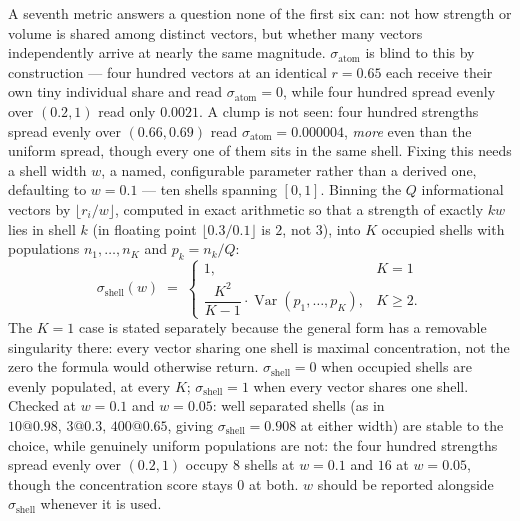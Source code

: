 \documentclass[12pt, a4paper]{article}
\begin{document}
A seventh metric answers a question none of the first six can: not
how strength or volume is shared among distinct vectors, but whether
many vectors independently arrive at nearly the same magnitude.
$\sigma_{\text{atom}}$ is blind to this by construction --- four hundred vectors at an identical $r=0.65$ each receive their own tiny individual share and read $\sigma_{\text{atom}}=0$, while four hundred spread evenly over $(0.2,1)$ read only $0.0021$. A clump is not seen: four hundred strengths spread evenly over $(0.66,0.69)$ read $\sigma_{\text{atom}}=0.000004$, \emph{more} even than the uniform spread, though every one of them sits in the same shell. Fixing this needs a shell width $w$, a named,
configurable parameter rather than a derived one, defaulting to
$w=0.1$ --- ten shells spanning $[0,1]$. Binning the $Q$ informational vectors by $\lfloor r_i/w\rfloor$, computed in exact arithmetic so that a strength of exactly $kw$ lies in shell $k$ (in floating point $\lfloor 0.3/0.1\rfloor$ is $2$, not $3$), into $K$ occupied shells with populations $n_1,\ldots,n_K$ and $p_k = n_k/Q$:
\begin{equation}
    \sigma_{\text{shell}}(w) \;=\;
    \begin{cases}
        1, & K=1 \\[4pt]
        \dfrac{K^2}{K-1}\cdot\operatorname{Var}(p_1,\ldots,p_K), & K\ge 2.
    \end{cases}
    \label{eq:shell_concentration}
\end{equation}
The $K=1$ case is stated separately because the general form has a
removable singularity there: every vector sharing one shell is
maximal concentration, not the zero the formula would otherwise
return. $\sigma_{\text{shell}}=0$ when occupied shells are evenly populated, at every $K$; $\sigma_{\text{shell}}=1$ when every
vector shares one shell. Checked at $w=0.1$ and $w=0.05$: well
separated shells (as in $10@0.98,\,3@0.3,\,400@0.65$, giving
$\sigma_{\text{shell}}=0.908$ at either width) are stable to the
choice, while genuinely uniform populations are not: the four hundred strengths spread evenly over $(0.2,1)$ occupy $8$ shells at $w=0.1$ and $16$ at $w=0.05$, though the concentration score stays $0$ at both. $w$ should be reported alongside
$\sigma_{\text{shell}}$ whenever it is used.
\end{document}

